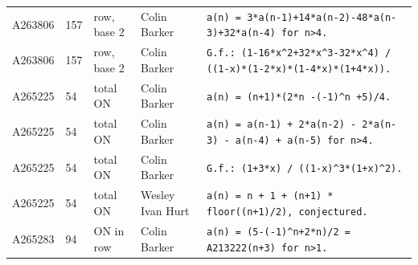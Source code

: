 \documentclass[11pt]{article}
\theoremstyle{definition}
\theoremstyle{remark}
\begin{document}
{\begin{longtable}{p{1.3cm}p{0.7cm}p{2.4cm}p{2.3cm}p{7.3cm}}
A263806 & 157 & row, base 2 & Colin Barker & \texttt{a(n)\allowbreak{} \allowbreak{}=\allowbreak{} \allowbreak{}3*\allowbreak{}a(n-\allowbreak{}1)\allowbreak{}+\allowbreak{}14*\allowbreak{}a(n-\allowbreak{}2)\allowbreak{}-\allowbreak{}48*\allowbreak{}a(n-\allowbreak{}3)\allowbreak{}+\allowbreak{}32*\allowbreak{}a(n-\allowbreak{}4)\allowbreak{} \allowbreak{}for \allowbreak{}n>4.} \\
A263806 & 157 & row, base 2 & Colin Barker & \texttt{G.f.: \allowbreak{}(1-\allowbreak{}16*\allowbreak{}x\^{}2+\allowbreak{}32*\allowbreak{}x\^{}3-\allowbreak{}32*\allowbreak{}x\^{}4)\allowbreak{} \allowbreak{}/\allowbreak{} \allowbreak{}((1-\allowbreak{}x)\allowbreak{}*\allowbreak{}(1-\allowbreak{}2*\allowbreak{}x)\allowbreak{}*\allowbreak{}(1-\allowbreak{}4*\allowbreak{}x)\allowbreak{}*\allowbreak{}(1+\allowbreak{}4*\allowbreak{}x)\allowbreak{})\allowbreak{}.} \\
A265225 & 54 & total ON & Colin Barker & \texttt{a(n)\allowbreak{} \allowbreak{}=\allowbreak{} \allowbreak{}(n+\allowbreak{}1)\allowbreak{}*\allowbreak{}(2*\allowbreak{}n \allowbreak{}-\allowbreak{}(-\allowbreak{}1)\allowbreak{}\^{}n \allowbreak{}+\allowbreak{}5)\allowbreak{}/\allowbreak{}4.} \\
A265225 & 54 & total ON & Colin Barker & \texttt{a(n)\allowbreak{} \allowbreak{}=\allowbreak{} \allowbreak{}a(n-\allowbreak{}1)\allowbreak{} \allowbreak{}+\allowbreak{} \allowbreak{}2*\allowbreak{}a(n-\allowbreak{}2)\allowbreak{} \allowbreak{}-\allowbreak{} \allowbreak{}2*\allowbreak{}a(n-\allowbreak{}3)\allowbreak{} \allowbreak{}-\allowbreak{} \allowbreak{}a(n-\allowbreak{}4)\allowbreak{} \allowbreak{}+\allowbreak{} \allowbreak{}a(n-\allowbreak{}5)\allowbreak{} \allowbreak{}for \allowbreak{}n>4.} \\
A265225 & 54 & total ON & Colin Barker & \texttt{G.f.: \allowbreak{}(1+\allowbreak{}3*\allowbreak{}x)\allowbreak{} \allowbreak{}/\allowbreak{} \allowbreak{}((1-\allowbreak{}x)\allowbreak{}\^{}3*\allowbreak{}(1+\allowbreak{}x)\allowbreak{}\^{}2)\allowbreak{}.} \\
A265225 & 54 & total ON & Wesley Ivan Hurt & \texttt{a(n)\allowbreak{} \allowbreak{}=\allowbreak{} \allowbreak{}n \allowbreak{}+\allowbreak{} \allowbreak{}1 \allowbreak{}+\allowbreak{} \allowbreak{}(n+\allowbreak{}1)\allowbreak{} \allowbreak{}*\allowbreak{} \allowbreak{}floor((n+\allowbreak{}1)\allowbreak{}/\allowbreak{}2)\allowbreak{},\allowbreak{} \allowbreak{}conjectured.} \\
A265283 & 94 & ON in row & Colin Barker & \texttt{a(n)\allowbreak{} \allowbreak{}=\allowbreak{} \allowbreak{}(5-\allowbreak{}(-\allowbreak{}1)\allowbreak{}\^{}n+\allowbreak{}2*\allowbreak{}n)\allowbreak{}/\allowbreak{}2 \allowbreak{}=\allowbreak{} \allowbreak{}A213222(n+\allowbreak{}3)\allowbreak{} \allowbreak{}for \allowbreak{}n>1.} \\

\end{longtable}}
\end{document}

